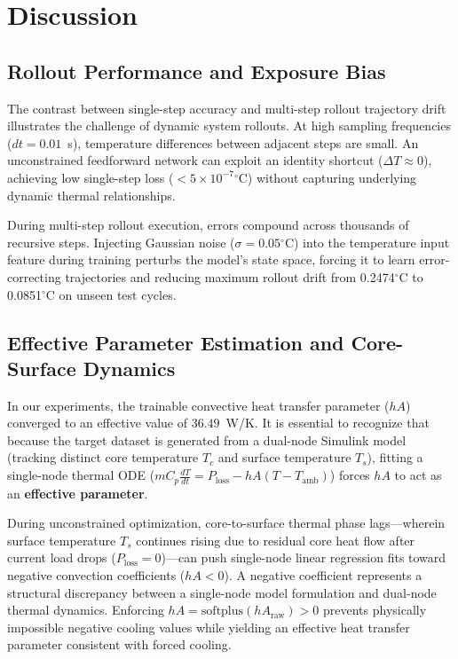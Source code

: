 \section{Discussion}

\subsection{Rollout Performance and Exposure Bias}
The contrast between single-step accuracy and multi-step rollout trajectory drift illustrates the challenge of dynamic system rollouts. At high sampling frequencies ($dt = 0.01$~s), temperature differences between adjacent steps are small. An unconstrained feedforward network can exploit an identity shortcut ($\Delta T \approx 0$), achieving low single-step loss ($< 5 \times 10^{-7}$$^\circ$C) without capturing underlying dynamic thermal relationships.

During multi-step rollout execution, errors compound across thousands of recursive steps. Injecting Gaussian noise ($\sigma = 0.05$$^\circ$C) into the temperature input feature during training perturbs the model's state space, forcing it to learn error-correcting trajectories and reducing maximum rollout drift from 0.2474$^\circ$C to 0.0851$^\circ$C on unseen test cycles.

\subsection{Effective Parameter Estimation and Core-Surface Dynamics}
In our experiments, the trainable convective heat transfer parameter ($hA$) converged to an effective value of $36.49$~W/K. It is essential to recognize that because the target dataset is generated from a dual-node Simulink model (tracking distinct core temperature $T_c$ and surface temperature $T_s$), fitting a single-node thermal ODE ($m C_p \frac{dT}{dt} = P_{\text{loss}} - hA (T - T_{\text{amb}})$) forces $hA$ to act as an \textbf{effective parameter}.

During unconstrained optimization, core-to-surface thermal phase lags—wherein surface temperature $T_s$ continues rising due to residual core heat flow after current load drops ($P_{\text{loss}} = 0$)—can push single-node linear regression fits toward negative convection coefficients ($hA < 0$). A negative coefficient represents a structural discrepancy between a single-node model formulation and dual-node thermal dynamics. Enforcing $hA = \text{softplus}(hA_{\text{raw}}) > 0$ prevents physically impossible negative cooling values while yielding an effective heat transfer parameter consistent with forced cooling.

